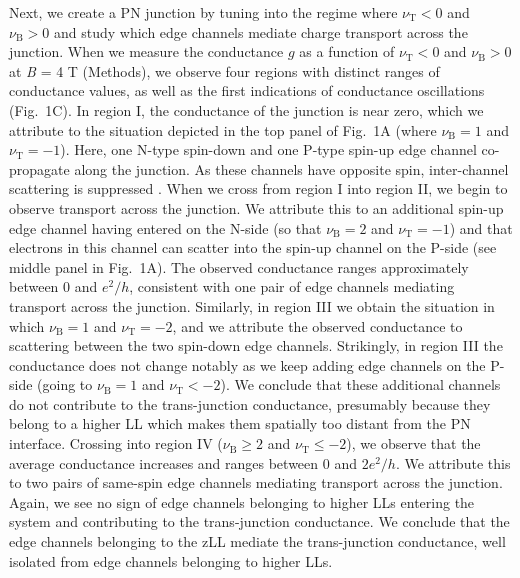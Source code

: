 \documentclass[%
reprint,amsmath,amssymb,aps,prl,superscriptaddress,
twocolumn
]{revtex4-1}
\begin{document}
	Next, we create a PN junction by tuning into the regime where $\nu_\mathrm{T}<0$ and $\nu_\mathrm{B}>0$ and study which edge channels mediate charge transport across the junction. When we measure the conductance $g$ as a function of $\nu_\mathrm{T}<0$ and $\nu_\mathrm{B}>0$ at  \emph{B} = 4 T (Methods), we observe four regions with distinct ranges of conductance values, as well as the first indications of conductance oscillations (Fig.~1C). In region I, the conductance of the junction is near zero, which we attribute to the situation depicted in the top panel of Fig.~1A (where $\nu_\mathrm{B}=1$ and $\nu_\mathrm{T}=-1$). Here, one N-type spin-down and one P-type spin-up edge channel co-propagate along the junction. As these channels have opposite spin, inter-channel scattering is suppressed \cite{Amet2014}. When we cross from region I into region II, we begin to observe transport across the junction. We attribute this to an additional spin-up edge channel having entered on the N-side (so that $\nu_\mathrm{B}=2$ and $\nu_\mathrm{T}=-1$) and that electrons in this channel can scatter into the spin-up channel on the P-side (see middle panel in Fig.~1A). The observed conductance ranges approximately between 0 and $e^2/h$, consistent with one pair of edge channels mediating transport across the junction. Similarly, in region III we obtain the situation in which $\nu_\mathrm{B}=1$ and $\nu_\mathrm{T}=-2$, and we attribute the observed conductance to scattering between the two spin-down edge channels. Strikingly, in region III the conductance does not change notably as we keep adding edge channels on the P-side (going to $\nu_\mathrm{B}=1$ and $\nu_\mathrm{T}<-2$). We conclude that these additional channels do not contribute to the trans-junction conductance, presumably because they belong to a higher LL which makes them spatially too distant from the PN interface. Crossing into region IV ($\nu_\mathrm{B} \geq 2$ and  $\nu_\mathrm{T} \leq -2$), we observe that the average conductance increases and ranges between 0 and $2e^2/h$. We attribute this to two pairs of same-spin edge channels mediating transport across the junction. Again, we see no sign of edge channels belonging to higher LLs entering the system and contributing to the trans-junction conductance. We conclude that the edge channels belonging to the zLL mediate the trans-junction conductance, well isolated from edge channels belonging to higher LLs.
			
\end{document}
